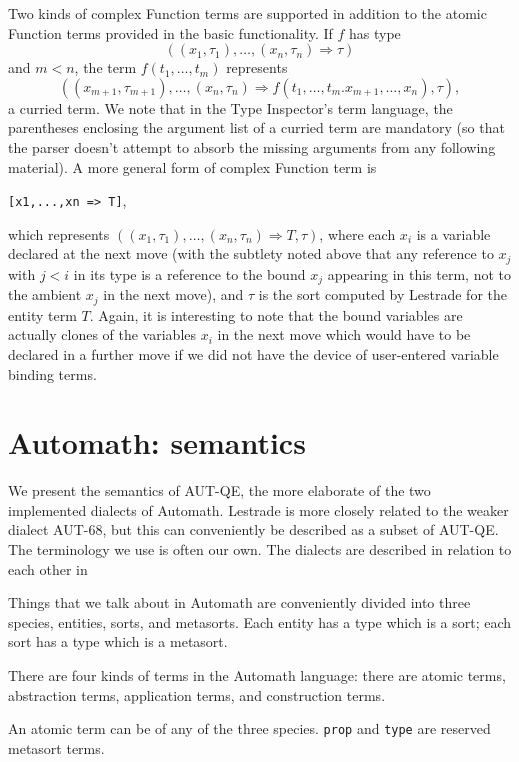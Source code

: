 \documentclass{article}
\begin{document}
Two kinds of complex Function terms are supported in addition to the atomic Function terms provided in the basic functionality.  If $f$ has
type $$((x_1,\tau_1),\ldots,(x_n,\tau_n) \Rightarrow \tau)$$ and $m<n$, the term $f(t_1,\ldots,t_m)$ represents
$$((x_{m+1},\tau_{m+1}),\ldots,(x_n,\tau_n) \Rightarrow f(t_1,\ldots,t_m.x_{m+1},\ldots,x_n),\tau),$$ a curried term.  We note that in the Type Inspector's term language, the parentheses enclosing the argument list of a curried term are mandatory (so that the parser doesn't attempt to absorb the missing arguments from any following material).  A more general form of complex Function term is \begin{center}{\tt [x1,...,xn => T]},\end{center}which represents
$((x_1,\tau_1),\ldots,(x_n,\tau_n) \Rightarrow T,\tau)$, where each $x_i$ is a variable declared at the next move (with the subtlety noted above that
any reference to $x_j$ with $j<i$ in its type is a reference to the bound $x_j$ appearing in this term, not to the ambient $x_j$ in the next move), and $\tau$ is the sort computed by Lestrade for the entity term $T$.  Again, it is interesting to note that the bound variables are actually clones of the variables $x_i$ in the next move which would have to be declared in a further move if we did not have the device of user-entered variable binding terms.



\section{Automath:  semantics}

We present the semantics of AUT-QE, the more elaborate of the two implemented dialects of Automath.  Lestrade is more closely related to the weaker dialect AUT-68, but this can conveniently be described as a subset of AUT-QE.  The terminology we use is often our own.  The dialects are described in relation to each other in \cite{vandaalena3}

Things that we talk about in Automath are conveniently divided into three species, entities, sorts, and metasorts.  Each entity has a type which is a sort;  each sort has a type which is a metasort.

There are four kinds of terms in the Automath language:  there are atomic terms, abstraction terms, application terms, and construction terms.

An atomic term can be of any of the three species.  {\tt prop} and {\tt type} are reserved metasort terms.
\end{document}
